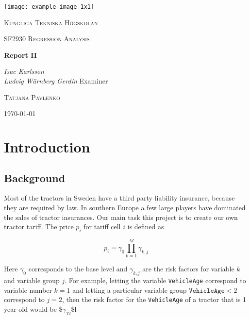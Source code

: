 \documentclass[11pt]{article}
\author{Ludde}
\date{\today}
\title{}
\begin{document}
\begin{titlepage}
\centering
\texttt{[image: example-image-1x1]}\par\vspace{1cm}
{\scshape\LARGE Kungliga Tekniska Högskolan \par}
\vspace{1cm}
{\scshape\Large SF2930 Regression Analysis \par}
\vspace{1.5cm}
{\huge\bfseries Report II \\  \par}
\vspace{2cm}
{\Large\itshape Isac Karlsson \\ Ludvig Wärnberg Gerdin}
\vfill
Examiner \par
\textsc{Tatjana Pavlenko}

\vfill

{\large \today\par}
\end{titlepage}

\newpage
\tableofcontents
\newpage

\section{Introduction}
\label{sec:org22b96bb}
\subsection{Background}
\label{sec:org313190c}
Most of the tractors in Sweden have a third party liability insurance, because they are required by law. 
In southern Europe a few large players have dominated the sales of tractor insurances. Our main task this
project is to create our own tractor tariff. The price \(p_i\) for tariff cell \(i\) is defined as

\begin{equation}
\label{eq:org35c57d9}
  p_i = \gamma_0 \prod_{k = 1}^M \gamma_{k,j}   
\end{equation}

Here \(\gamma_{\text{0}}\) corresponds to the base level and \(\gamma_{k,j}\) are the risk factors for variable \(k\) and 
variable group \(j\). For example, letting the variable \texttt{VehicleAge} correspond to variable 
number \(k = 1\) and letting a particular variable group \(\texttt{VehicleAge} < 2\) correspond to \(j = 2\), 
then the risk factor for the \texttt{VehicleAge} of a tractor that is 1 year old would be \$\(\gamma_{\text{12}}\)\$l
\end{document}
